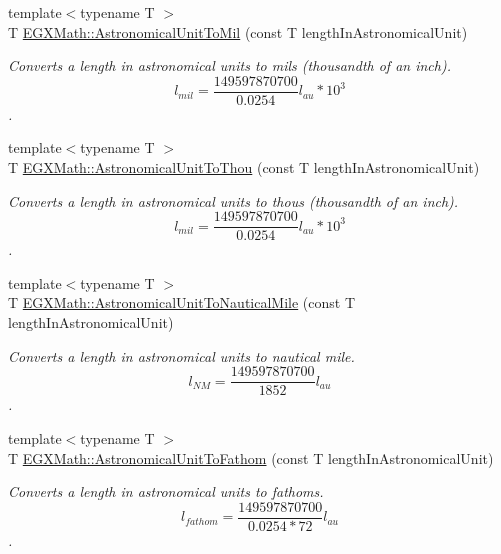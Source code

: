 \begin{DoxyCompactItemize}
{\footnotesize template$<$typename T $>$ }\\T \mbox{\hyperlink{group___e_g_x_math-_conversions-_length_conversions-_astronomical-_astronomical_unit-_imperial_ga5a4de19a0aa243fb3b3ea8e014f7c574}{E\+G\+X\+Math\+::\+Astronomical\+Unit\+To\+Mil}} (const T length\+In\+Astronomical\+Unit)
\begin{DoxyCompactList}\small\item\em Converts a length in astronomical units to mils (thousandth of an inch). \[ l_{mil}= \frac{149597870700}{0.0254} l_{au} * 10^{3} \]. \end{DoxyCompactList}\item 
{\footnotesize template$<$typename T $>$ }\\T \mbox{\hyperlink{group___e_g_x_math-_conversions-_length_conversions-_astronomical-_astronomical_unit-_imperial_ga6c8f186a4c27fd488b82e76d8e27f8a8}{E\+G\+X\+Math\+::\+Astronomical\+Unit\+To\+Thou}} (const T length\+In\+Astronomical\+Unit)
\begin{DoxyCompactList}\small\item\em Converts a length in astronomical units to thous (thousandth of an inch). \[ l_{mil}= \frac{149597870700}{0.0254} l_{au} * 10^{3} \]. \end{DoxyCompactList}\item 
{\footnotesize template$<$typename T $>$ }\\T \mbox{\hyperlink{group___e_g_x_math-_conversions-_length_conversions-_astronomical-_astronomical_unit-_nautical_ga1d18851a119546f6a8e95e3051559f2e}{E\+G\+X\+Math\+::\+Astronomical\+Unit\+To\+Nautical\+Mile}} (const T length\+In\+Astronomical\+Unit)
\begin{DoxyCompactList}\small\item\em Converts a length in astronomical units to nautical mile. \[ l_{NM}= \frac{149597870700}{1852} l_{au} \]. \end{DoxyCompactList}\item 
{\footnotesize template$<$typename T $>$ }\\T \mbox{\hyperlink{group___e_g_x_math-_conversions-_length_conversions-_astronomical-_astronomical_unit-_nautical_ga160015df7b4feb28baa02d92a7f43d5c}{E\+G\+X\+Math\+::\+Astronomical\+Unit\+To\+Fathom}} (const T length\+In\+Astronomical\+Unit)
\begin{DoxyCompactList}\small\item\em Converts a length in astronomical units to fathoms. \[ l_{fathom}= \frac{149597870700}{0.0254 * 72} l_{au} \]. \end{DoxyCompactList}\item 

\end{DoxyCompactItemize}
